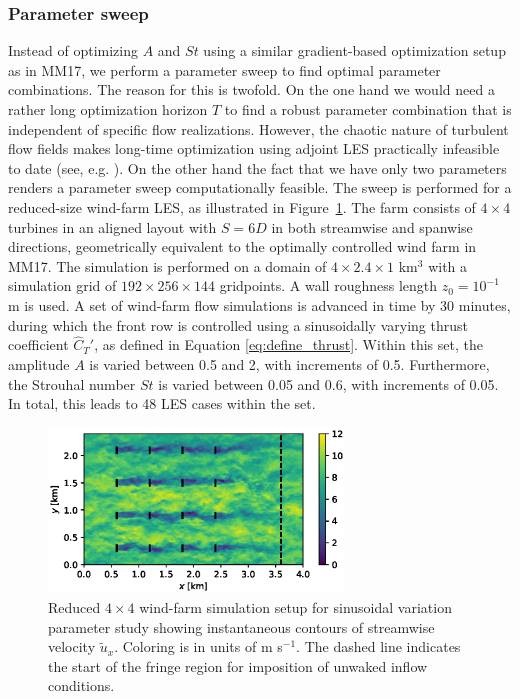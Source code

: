 \documentclass[wes, manuscript]{copernicus}
\newcommand{\cthat}{\widehat{C}_T'}
\begin{document}
\subsubsection{Parameter sweep}
Instead of optimizing $A$ and $St$ using a similar gradient-based optimization setup as in MM17, we perform a parameter sweep to find optimal parameter combinations. The reason for this is twofold. On the one hand we would need a rather long optimization horizon $T$ to find a robust parameter combination that is independent of specific flow realizations. However, the chaotic nature of turbulent flow fields makes long-time optimization using adjoint LES practically infeasible to date (see, e.g. \citealp{wang2014least}). On the other hand the fact that we have only two parameters renders a parameter sweep computationally feasible. The sweep is performed for a reduced-size wind-farm LES, as illustrated in Figure~\ref{fig:sinus_setup}. The farm consists of $4 \times 4$ turbines in an aligned layout with $S = 6D$ in both streamwise and spanwise directions, geometrically equivalent to the optimally controlled wind farm in MM17. The simulation is performed on a domain of $4 \times 2.4 \times 1$ km$^3$ with a simulation grid of $192 \times 256 \times 144$ gridpoints. A wall roughness length $z_0 = 10^{-1}$ m is used. A set of wind-farm flow simulations is advanced in time by 30 minutes, during which the front row is controlled using a sinusoidally varying thrust coefficient $\cthat$, as defined in Equation \eqref{eq:define_thrust}. Within this set, the amplitude $A$ is varied between 0.5 and 2, with increments of 0.5. Furthermore, the Strouhal number $St$ is varied between 0.05 and 0.6, with increments of 0.05. In total, this leads to 48 LES cases within the set. 

\begin{figure}
	\centering
	\includegraphics[width=0.7\textwidth]{setup_sinusoidal.eps}
	\caption{Reduced $4 \times 4$ wind-farm simulation setup for sinusoidal variation parameter study showing instantaneous contours of streamwise velocity $\widetilde{u}_x$. Coloring is in units of m s$^{-1}$. The dashed line indicates the start of the fringe region for imposition of unwaked inflow conditions. \label{fig:sinus_setup}}
\end{figure}
\end{document}
